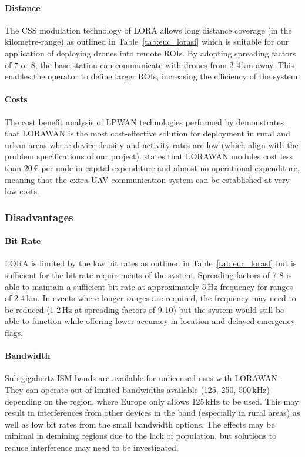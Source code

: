 \paragraph{Distance} The \gls{CSS} modulation technology of \gls{LORA} allows long distance coverage (in the kilometre-range) as outlined in Table~\ref{tab:euc_lorasf} which is suitable for our application of deploying drones into remote \gls{ROI}s. By adopting spreading factors of 7 or 8, the base station can communicate with drones from 2-4\,km away. This enables the operator to define larger \gls{ROI}s, increasing the efficiency of the system. 

\paragraph{Costs} The cost benefit analysis of \gls{LPWAN} technologies performed by \cite{hossain2021lpwancosts} demonstrates that \gls{LORAWAN} is the most cost-effective solution for deployment in rural and urban areas where device density and activity rates are low (which align with the problem specifications of our project). \cite{stokking2021lorawan} states that \gls{LORAWAN} modules cost less than 20\,€ per node in capital expenditure and almost no operational expenditure, meaning that the extra-\gls{UAV} communication system can be established at very low costs.
 
\subsubsection{Disadvantages}

\paragraph{Bit Rate} \gls{LORA} is limited by the low bit rates as outlined in Table~\ref{tab:euc_lorasf} but is sufficient for the bit rate requirements of the system. Spreading factors of 7-8 is able to maintain a sufficient bit rate at approximately 5\,Hz frequency for ranges of 2-4\,km. In events where longer ranges are required, the frequency may need to be reduced (1-2\,Hz at spreading factors of 9-10) but the system would still be able to function while offering lower accuracy in location and delayed emergency flags. 

\paragraph{Bandwidth} Sub-gigahertz \gls{ISM} bands are available for unlicensed uses with \gls{LORAWAN} \cite{stokking2021lorawan}. They can operate out of limited bandwidths available (125, 250, 500\,kHz) depending on the region, where Europe only allows 125\,kHz to be used. This may result in interferences from other devices in the band (especially in rural areas) as well as low bit rates from the small bandwidth options. The effects may be minimal in demining regions due to the lack of population, but solutions to reduce interference may need to be investigated. 

